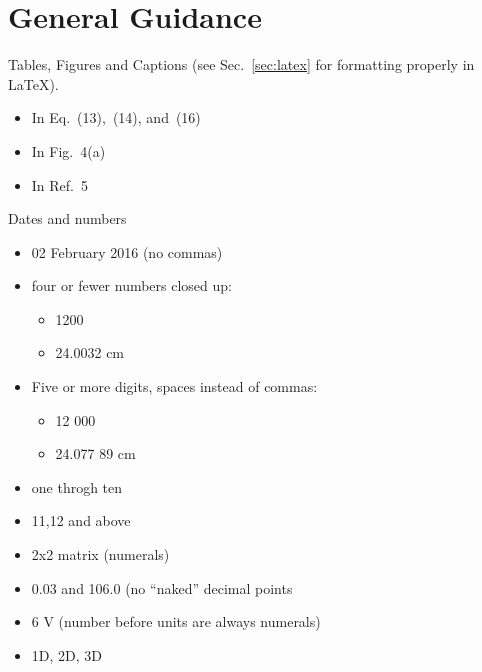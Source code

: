 \documentclass[10pt, letter]{article}
\begin{document}
\raggedbottom
\tableofcontents
\pagebreak
\section{General Guidance}\label{sec:general_guidance}

\begin{multicols}{2}
\raggedcolumns
Tables, Figures and Captions (see Sec.~\ref{sec:latex} for formatting
properly in \LaTeX).
\begin{itemize}
\item In Eq.~(13),~(14), and~(16)
\item In Fig.~4(a)
\item In Ref.~5
\end{itemize}

Dates and numbers
\begin{itemize}
\item 02 February 2016 (no commas) 
\item four or fewer numbers closed up:
  \begin{itemize}
  \item 1200
  \item 24.0032 cm
  \end{itemize}
\item Five or more digits, spaces instead of commas:
  \begin{itemize}
  \item 12 000
  \item 24.077 89 cm
  \end{itemize}
\item one throgh ten
\item 11,12 and above
\item 2x2 matrix (numerals)
\item 0.03 and 106.0 (no ``naked'' decimal points
\item 6 V (number before units are always numerals)
\item 1D, 2D, 3D
\end{itemize}


\end{multicols}
\end{document}
